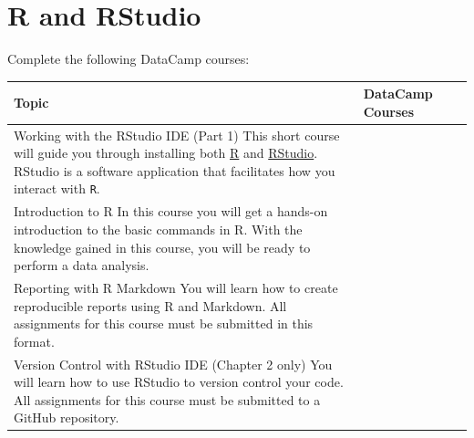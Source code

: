 \documentclass[]{book}
\theoremstyle{definition}
\theoremstyle{definition}
\theoremstyle{definition}
\theoremstyle{remark}
\begin{document}
\section{R and RStudio}\label{r-and-rstudio}

Complete the following DataCamp courses:

\begin{longtable}[]{@{}lll@{}}
\toprule
\begin{minipage}[b]{0.30\columnwidth}\raggedright\strut
Topic\strut
\end{minipage} & \begin{minipage}[b]{0.30\columnwidth}\raggedright\strut
DataCamp Courses\strut
\end{minipage}\tabularnewline
\midrule
\endhead
\begin{minipage}[t]{0.30\columnwidth}\raggedright\strut
Working with the RStudio IDE (Part 1) This short course will guide you
through installing both \href{https://cran.r-project.org/}{R} and
\href{https://www.rstudio.com/products/rstudio/download/preview/}{RStudio}.
RStudio is a software application that facilitates how you interact with
\texttt{R}.\strut
\end{minipage} & \begin{minipage}[t]{0.30\columnwidth}\raggedright\strut
\strut
\end{minipage}\tabularnewline
\begin{minipage}[t]{0.30\columnwidth}\raggedright\strut
Introduction to R In this course you will get a hands-on introduction to
the basic commands in R. With the knowledge gained in this course, you
will be ready to perform a data analysis.\strut
\end{minipage} & \begin{minipage}[t]{0.30\columnwidth}\raggedright\strut
\strut
\end{minipage}\tabularnewline
\begin{minipage}[t]{0.30\columnwidth}\raggedright\strut
Reporting with R Markdown You will learn how to create reproducible
reports using R and Markdown. All assignments for this course must be
submitted in this format.\strut
\end{minipage} & \begin{minipage}[t]{0.30\columnwidth}\raggedright\strut
\strut
\end{minipage}\tabularnewline
\begin{minipage}[t]{0.30\columnwidth}\raggedright\strut
Version Control with RStudio IDE (Chapter 2 only) You will learn how to
use RStudio to version control your code. All assignments for this
course must be submitted to a GitHub repository.\strut
\end{minipage} & \begin{minipage}[t]{0.30\columnwidth}\raggedright\strut
\strut
\end{minipage}\tabularnewline
\bottomrule
\end{longtable}
\end{document}
